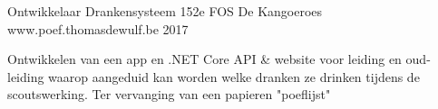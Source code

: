 


\begin{cventries}


\cventry
{Ontwikkelaar} %
{Drankensysteem 152e FOS De Kangoeroes} %
{www.poef.thomasdewulf.be} %
{2017} %
{ 
\begin{cvitems}
\item {Ontwikkelen van een app en .NET Core API \& website voor leiding en oud-leiding waarop aangeduid kan worden welke dranken ze drinken tijdens de scoutswerking. Ter vervanging van een papieren "poeflijst"}
\end{cvitems}}

\end{cventries}